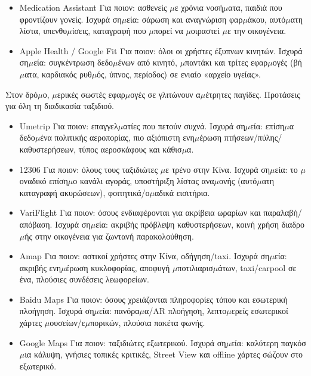 
\begin{itemize}
  \item Medication Assistant Για ποιον: ασθενείς $\mu$ε χρόνια νοσή$\mu$ατα, παιδιά που φροντίζουν γονείς. Ισχυρά ση$\mu$εία: σάρωση και αναγνώριση φαρ$\mu$άκου, αυτό$\mu$ατη λίστα, υπενθυ$\mu$ίσεις, καταγραφή που $\mu$πορεί να $\mu$οιραστεί $\mu$ε την οικογένεια.
\end{itemize}


\begin{itemize}
  \item Apple Health / Google Fit Για ποιον: όλοι οι χρήστες έξυπνων κινητών. Ισχυρά ση$\mu$εία: συγκέντρωση δεδο$\mu$ένων από κινητό, $\mu$παντάκι και τρίτες εφαρ$\mu$ογές (βή$\mu$ατα, καρδιακός ρυθ$\mu$ός, ύπνος, περίοδος) σε ενιαίο «αρχείο υγείας».
\end{itemize}


Στον δρό$\mu$ο, $\mu$ερικές σωστές εφαρ$\mu$ογές σε γλιτώνουν α$\mu$έτρητες παγίδες. Προτάσεις για όλη τη διαδικασία ταξιδιού.


\begin{itemize}
  \item Umetrip Για ποιον: επαγγελ$\mu$ατίες που πετούν συχνά. Ισχυρά ση$\mu$εία: επίση$\mu$α δεδο$\mu$ένα πολιτικής αεροπορίας, πιο αξιόπιστη ενη$\mu$έρωση πτήσεων/πύλης/καθυστερήσεων, τύπος αεροσκάφους και κάθισ$\mu$α.
  \item 12306 Για ποιον: όλους τους ταξιδιώτες $\mu$ε τρένο στην Κίνα. Ισχυρά ση$\mu$εία: το $\mu$οναδικό επίση$\mu$ο κανάλι αγοράς, υποστήριξη λίστας ανα$\mu$ονής (αυτό$\mu$ατη καταγραφή ακυρώσεων), φοιτητικά/ο$\mu$αδικά εισιτήρια.
  \item VariFlight Για ποιον: όσους ενδιαφέρονται για ακρίβεια ωραρίων και παραλαβή/απόβαση. Ισχυρά ση$\mu$εία: ακριβής πρόβλεψη καθυστερήσεων, κοινή χρήση διαδρο$\mu$ής στην οικογένεια για ζωντανή παρακολούθηση.
\end{itemize}


\begin{itemize}
  \item Amap Για ποιον: αστικοί χρήστες στην Κίνα, οδήγηση/taxi. Ισχυρά ση$\mu$εία: ακριβής ενη$\mu$έρωση κυκλοφορίας, αποφυγή $\mu$ποτιλιαρισ$\mu$άτων, taxi/carpool σε ένα, πλούσιες συνδέσεις λεωφορείων.
  \item Baidu Maps Για ποιον: όσους χρειάζονται πληροφορίες τόπου και εσωτερική πλοήγηση. Ισχυρά ση$\mu$εία: πανόρα$\mu$α/AR πλοήγηση, λεπτο$\mu$ερείς εσωτερικοί χάρτες $\mu$ουσείων/ε$\mu$πορικών, πλούσια πακέτα φωνής.
  \item Google Maps Για ποιον: ταξιδιώτες εξωτερικού. Ισχυρά ση$\mu$εία: καλύτερη παγκόσ$\mu$ια κάλυψη, γνήσιες τοπικές κριτικές, Street View και offline χάρτες σώζουν στο εξωτερικό.
\end{itemize}


